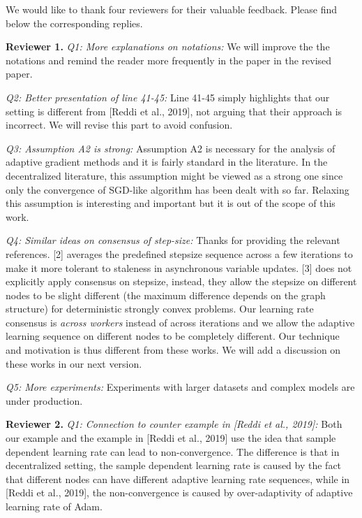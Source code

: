 \documentclass{article}
\begin{document}
We would like to thank four reviewers for their valuable feedback. Please find below the corresponding replies.

\textbf{Reviewer 1.}
\textit{Q1: More explanations on notations:} 
We will improve the the notations and remind the reader more frequently in the paper in the revised paper.

\textit{Q2: Better presentation of line 41-45:} Line 41-45 simply highlights that our setting is different from  [Reddi et al., 2019], not arguing that their approach is incorrect. We will revise this part to avoid confusion.

\textit{Q3: Assumption A2 is strong:}
Assumption A2 is necessary for the analysis of adaptive gradient methods and it is fairly standard in the literature.
In the decentralized literature, this assumption might be viewed as a strong one since only the convergence of SGD-like algorithm has been dealt with so far.
Relaxing this assumption is interesting and important but it is out of the scope of this work. 

\textit{Q4: Similar ideas on consensus of step-size:}
Thanks for providing the relevant references. 
[2] averages the predefined stepsize sequence across a few iterations to make it more tolerant to staleness in asynchronous variable updates.  
[3] does not explicitly apply consensus on stepsize, instead,  they allow the stepsize on different nodes to be slight different (the maximum difference depends on the graph structure) for deterministic strongly convex problems. 
Our learning rate consensus is \emph{across workers} instead of across iterations and we allow the adaptive learning sequence on different nodes to be completely different. 
Our technique and motivation is thus different from these works. 
We will add a discussion on these works in our next version.

\textit{Q5: More experiments:}
Experiments with larger datasets and complex models are under production.

\textbf{Reviewer 2.}
\textit{Q1: Connection to counter example in [Reddi et al., 2019]:}
Both our example and the example in [Reddi et al., 2019] use the idea that sample dependent learning rate can lead to non-convergence. 
The difference is that in decentralized setting, the sample dependent learning rate is caused by the fact that different nodes can have different adaptive learning rate sequences, while in [Reddi et al., 2019], the non-convergence is caused by over-adaptivity of adaptive learning rate of Adam. 
\end{document}
